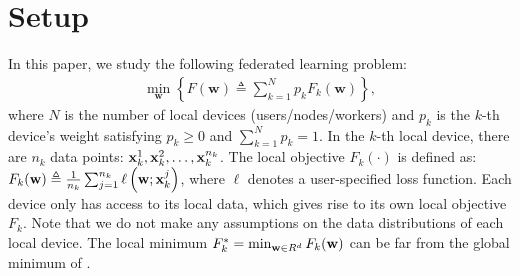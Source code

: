 

\section{Setup}


In this paper, we study the following federated learning problem:
\begin{align}
	\min _{\mathbf{w}}\left\{F(\mathbf{w}) \triangleq \sum\nolimits_{k=1}^{N} p_{k} F_{k}(\mathbf{w})\right\},
	\label{eq:problem}
\end{align}
where $N$ is the number of local devices (users/nodes/workers) and $p_k$ is the $k$-th device's weight satisfying $p_k \geq 0$ and $\sum_{k=1}^N p_k = 1$. 
In the $k$-th local device, there are $n_k$ data points:
${\mathbf{x}}_k^1, {\mathbf{x}}_k^2, \dots, {\mathbf{x}}_k^{n_k}$.  
The local objective $F_k(\cdot)$ is defined as:
$F_{k}(\mathbf{w}) \triangleq \frac{1}{n_{k}} \sum_{j=1}^{n_{k}} \ell\left(\mathbf{w} ; {\mathbf{x}}_k^j\right)$,
where $\ell$ denotes a user-specified loss function. Each device only has access to its local data, which gives rise to its own local objective $F_k$. Note that we do not make any assumptions on the
data distributions of each local device. The local minimum
$F^{*}_k= \min_{{\mathbf{w}} \in R^d} F_k({\mathbf{w}})$ can be far from
the global minimum of \eq{\ref{eq:problem}}.



